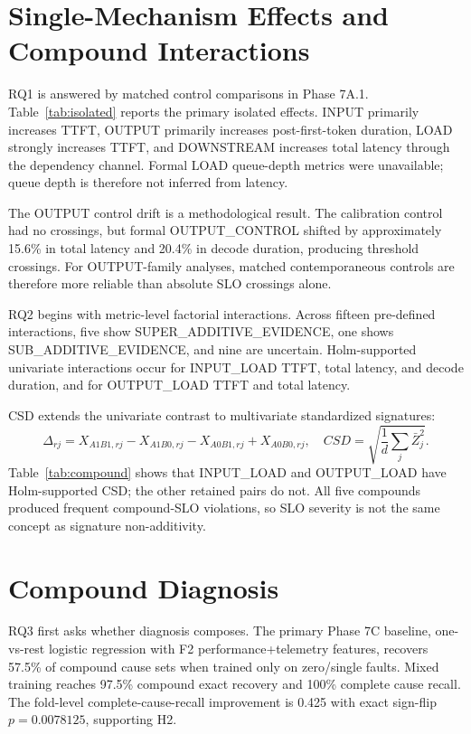 \documentclass[11pt]{article}
\begin{document}
\section{Single-Mechanism Effects and Compound Interactions}
RQ1 is answered by matched control comparisons in Phase 7A.1. Table~\ref{tab:isolated} reports the primary isolated effects. INPUT primarily increases TTFT, OUTPUT primarily increases post-first-token duration, LOAD strongly increases TTFT, and DOWNSTREAM increases total latency through the dependency channel. Formal LOAD queue-depth metrics were unavailable; queue depth is therefore not inferred from latency.



The OUTPUT control drift is a methodological result. The calibration control had no crossings, but formal OUTPUT\_CONTROL shifted by approximately 15.6\% in total latency and 20.4\% in decode duration, producing threshold crossings. For OUTPUT-family analyses, matched contemporaneous controls are therefore more reliable than absolute SLO crossings alone.

RQ2 begins with metric-level factorial interactions. Across fifteen pre-defined interactions, five show SUPER\_ADDITIVE\_EVIDENCE, one shows SUB\_ADDITIVE\_EVIDENCE, and nine are uncertain. Holm-supported univariate interactions occur for INPUT\_LOAD TTFT, total latency, and decode duration, and for OUTPUT\_LOAD TTFT and total latency.

CSD extends the univariate contrast to multivariate standardized signatures:
\[
\Delta_{rj}=X_{A1B1,rj}-X_{A1B0,rj}-X_{A0B1,rj}+X_{A0B0,rj},
\quad
CSD=\sqrt{\frac{1}{d}\sum_j \bar{Z}_j^2}.
\]
Table~\ref{tab:compound} shows that INPUT\_LOAD and OUTPUT\_LOAD have Holm-supported CSD; the other retained pairs do not. All five compounds produced frequent compound-SLO violations, so SLO severity is not the same concept as signature non-additivity.



\section{Compound Diagnosis}
RQ3 first asks whether diagnosis composes. The primary Phase 7C baseline, one-vs-rest logistic regression with F2 performance+telemetry features, recovers 57.5\% of compound cause sets when trained only on zero/single faults. Mixed training reaches 97.5\% compound exact recovery and 100\% complete cause recall. The fold-level complete-cause-recall improvement is 0.425 with exact sign-flip \(p=0.0078125\), supporting H2.
\end{document}
